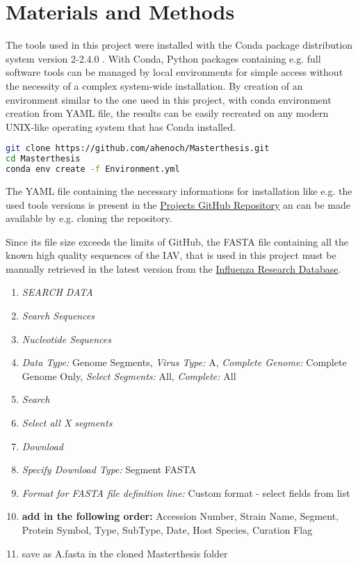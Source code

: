 \chapter{Materials and Methods} \label{chap:Materials_and_Methods}

The tools used in this project were installed with the Conda package distribution system version 2-2.4.0 \autocite{anaconda_software_distribution_anaconda_2020}. With Conda, Python packages containing e.g. full software tools can be managed by local environments for simple access without the necessity of a complex system-wide installation. By creation of an environment similar to the one used in this project, with conda environment creation from YAML file, the results can be easily recreated on any modern UNIX-like operating system that has Conda installed. 

\begin{lstlisting}[language=sh]
git clone https://github.com/ahenoch/Masterthesis.git
cd Masterthesis
conda env create -f Environment.yml
\end{lstlisting}  

The YAML file containing the necessary informations for installation like e.g. the used tools versions is present in the \href{https://github.com/ahenoch/Masterthesis.git}{Projects GitHub Repository} an can be made available by e.g. cloning the repository.

Since its file size exceeds the limits of GitHub, the FASTA file containing all the known high quality sequences of the \gls{IAV}, that is used in this project must be manually retrieved in the latest version from the \href{https://www.fludb.org/brc/home.spg?decorator=influenza}{Influenza Research Database}.

\begin{enumerate}[noitemsep]
    \item \textit{SEARCH DATA}
    \item \textit{Search Sequences}
    \item \textit{Nucleotide Sequences}
    \item \textit{Data Type:} Genome Segments, \textit{Virus Type:} A, \textit{Complete Genome:} Complete Genome Only, \textit{Select Segments:} All, \textit{Complete:} All
    \item \textit{Search}
    \item \textit{Select all X segments}
    \item \textit{Download}
    \item \textit{Specify Download Type:} Segment FASTA
    \item \textit{Format for FASTA file definition line:}  Custom format - select fields from list
    \item \textbf{add in the following order:} Accession Number, Strain Name, Segment, Protein Symbol, Type, SubType, Date, Host Species, Curation Flag
    \item save as A.fasta in the cloned Masterthesis folder
\end{enumerate}

